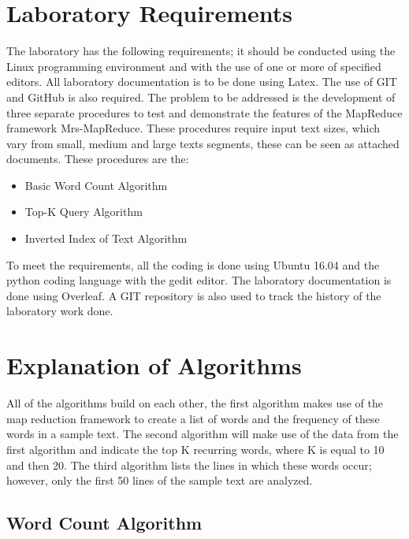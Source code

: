 \documentclass[twocolumn, 11pt]{IEEEtran}
\begin{document}
\section{Laboratory Requirements}

The laboratory has the following requirements; it should be conducted using the Linux programming environment and with the use of one or more of specified editors. All laboratory documentation is to be done using Latex. The use of GIT and GitHub is also required. The problem to be addressed is the development of three separate procedures to test and demonstrate the features of the MapReduce framework Mrs-MapReduce. These procedures require input text sizes, which vary from small, medium and large texts segments, these can be seen as attached documents. These procedures are the:  

\begin{itemize}

\item Basic Word Count Algorithm
\item Top-K Query Algorithm
\item Inverted Index of Text Algorithm

\end{itemize}


To meet the requirements, all the coding is done using Ubuntu 16.04 and the python coding language with the gedit editor. The laboratory documentation is done using Overleaf. A GIT repository is also used to track the history of the laboratory work done. 



\section{Explanation of Algorithms}

All of the algorithms build on each other, the first algorithm makes use of the map reduction framework to create a list of words and the frequency of these words in a sample text. The second algorithm will make use of the data from the first algorithm and indicate the top K recurring words, where K is equal to 10 and then 20. The third algorithm lists the lines in which these words occur; however, only the first 50 lines of the sample text are analyzed.


\subsection{Word Count Algorithm}
\end{document}
